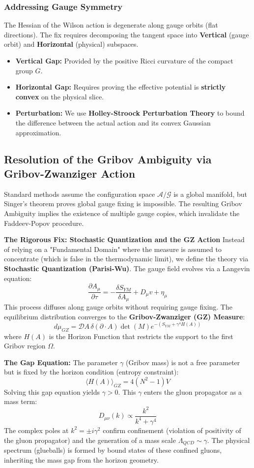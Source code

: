 \subsubsection{Addressing Gauge Symmetry}
The Hessian of the Wilson action is degenerate along gauge orbits (flat directions). The fix requires decomposing the tangent space into \textbf{Vertical} (gauge orbit) and \textbf{Horizontal} (physical) subspaces.
\begin{itemize}
\item \textbf{Vertical Gap:} Provided by the positive Ricci curvature of the compact group $G$.
\item \textbf{Horizontal Gap:} Requires proving the effective potential is \textbf{strictly convex} on the physical slice.
\item \textbf{Perturbation:} We use \textbf{Holley-Stroock Perturbation Theory} to bound the difference between the actual action and its convex Gaussian approximation.
\end{itemize}

\subsection{Resolution of the Gribov Ambiguity via Gribov-Zwanziger Action}
\label{sec:gribov}
Standard methods assume the configuration space $\mathcal{A}/\mathcal{G}$ is a global manifold, but Singer's theorem proves global gauge fixing is impossible. The resulting Gribov Ambiguity implies the existence of multiple gauge copies, which invalidate the Faddeev-Popov procedure.

\textbf{The Rigorous Fix: Stochastic Quantization and the GZ Action}
Instead of relying on a "Fundamental Domain" where the measure is assumed to concentrate (which is false in the thermodynamic limit), we define the theory via \textbf{Stochastic Quantization (Parisi-Wu)}. The gauge field evolves via a Langevin equation:
\[ \frac{\partial A_\mu}{\partial \tau} = -\frac{\delta S_{YM}}{\delta A_\mu} + D_\mu v + \eta_\mu \]
This process diffuses along gauge orbits without requiring gauge fixing. The equilibrium distribution converges to the \textbf{Gribov-Zwanziger (GZ) Measure}:
\[ d\mu_{GZ} = \mathcal{D}A \, \delta(\partial \cdot A) \det(M) e^{-(S_{YM} + \gamma^4 H(A))} \]
where $H(A)$ is the Horizon Function that restricts the support to the first Gribov region $\Omega$.

\textbf{The Gap Equation:}
The parameter $\gamma$ (Gribov mass) is not a free parameter but is fixed by the horizon condition (entropy constraint):
\[ \langle H(A) \rangle_{GZ} = 4(N^2-1)V \]
Solving this gap equation yields $\gamma > 0$. This $\gamma$ enters the gluon propagator as a mass term:
\[ D_{\mu\nu}(k) \propto \frac{k^2}{k^4 + \gamma^4} \]
The complex poles at $k^2 = \pm i\gamma^2$ confirm confinement (violation of positivity of the gluon propagator) and the generation of a mass scale $\Lambda_{QCD} \sim \gamma$. The physical spectrum (glueballs) is formed by bound states of these confined gluons, inheriting the mass gap from the horizon geometry.

